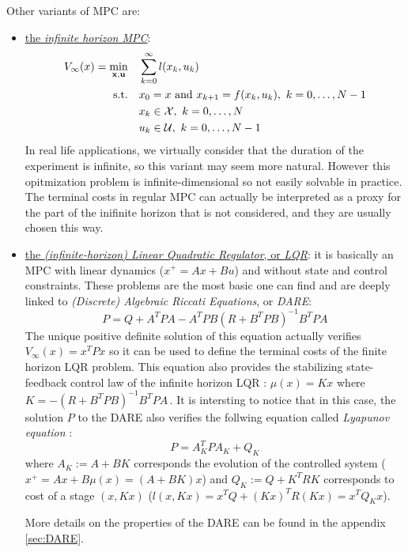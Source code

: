 \documentclass[12pt]{article}
\begin{document}
\vspace{12pt}

Other variants of MPC are:
\begin{itemize}[label=\textbullet]
	\item \underline{the \textit{infinite horizon MPC}}:
	\begin{align*}
		V_\infty(x)=\underset{\bf{x},\bf{u}}{\min} &\quad \sum_{k=0}^{\infty}l(x_k,u_k)\\
		\text{s.t.} &\quad x_0=x\text{ and }x_{k+1}=f(x_k,u_k),~k=0,\dots,N-1\\
		&\quad x_k\in\cal{X},~k=0,\dots,N\\
		&\quad u_k\in\cal{U},~k=0,\dots,N-1
	\end{align*}
	In real life applications, we virtually consider that the duration of the experiment is infinite, so this variant may seem more natural.
	However this opitmization problem is infinite-dimensional so not easily solvable in practice.
	The terminal costs in regular MPC can actually be interpreted as a proxy for the part of the inifinite horizon that is not considered, and they are usually chosen this way.

	\item\underline{the \textit{(infinite-horizon) Linear Quadratic Regulator}, or \textit{LQR}}:\newline
	it is basically an MPC with linear dynamics ($x^+=Ax+Bu$) and without state and control constraints.
	These problems are the most basic one can find and are deeply linked to \textit{(Discrete) Algebraic Riccati Equations}, or \textit{DARE}:
	\begin{equation}
		\label{eq:DARE-LQR}
		P=Q+A^TPA-A^TPB(R+B^TPB)^{-1}B^TPA
	\end{equation}
	The unique positive definite solution of this equation actually verifies $V_\infty(x)=x^TPx$ so it can be used to define the terminal costs of the finite horizon LQR problem.
	This equation also provides the stabilizing state-feedback control law of the infinite horizon LQR : $\mu(x)=Kx$ where $K=-(R+B^TPB)^{-1}B^TPA$\,.
	It is intersting to notice that in this case, the solution $P$ to the DARE also verifies the follwing equation called \textit{Lyapunov equation} :
	$$P=A_K^TPA_K+Q_K$$
	where $A_K:=A+BK$ corresponds the evolution of the controlled system ($x^+=Ax+B\mu(x)=(A+BK)x$) and $Q_K:=Q+K^TRK$ corresponds to cost of a stage $(x,Kx)$ ($l(x,Kx)=x^TQ+(Kx)^TR(Kx)=x^TQ_Kx$).

	More details on the properties of the DARE can be found in the appendix \ref{sec:DARE}.
\end{itemize}
\end{document}
